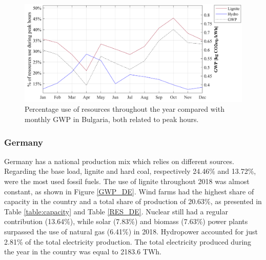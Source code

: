 {{	
\begin{figure}[htbp]
	\centering
	\includegraphics[width=1\textwidth]{ChapterLCA/Images/GWP_plots/Comp_GWP_BG.png}
	\caption{Percentage use of resources throughout the year compared with monthly GWP in Bulgaria, both related to peak hours.}
	\label{COMP_BG}
\end{figure}



\subsubsection{Germany}
Germany has a national production mix which relies on different sources. Regarding the base load, lignite and hard coal, {respectively 24.46\% and 13.72\%,} were the most used fossil fuels. The use of lignite throughout 2018 was almost constant, as shown in Figure \ref{GWP_DE}. Wind farms had the highest share of capacity in the country and a total share of production of 20.63\%, as presented in Table \ref{table:capacity} and Table \ref{RES_DE}. Nuclear still had  a regular contribution {(13.64\%)}, while solar {(7.83\%)} and biomass {(7.63\%)} power plants surpassed the use of natural gas {(6.41\%)} in 2018. Hydropower accounted for just 2.81\% of the total electricity production. The total electricity produced during the year in the country was equal to 2183.6 TWh. 


}}
